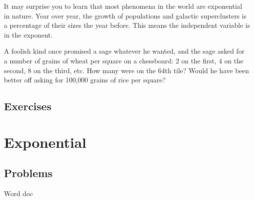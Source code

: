 

It may surprise you to learn that most phenomena in the world are exponential in nature.
Year over year, the growth of populations and galactic superclusters is a percentage of 
their sizes the year before.  This means the independent variable is in the exponent.

A foolish kind once promised a sage whatever he wanted, and the sage asked for
a number of grains of wheat per square on a chessboard: 2 on the first, 4 on the second, 
8 on the third, etc.  How many were on the 64th tile?  Would he have been better off
asking for 100,000 grains of rice per square?

\newpage
\chapterminitoc

\newpage
{}
\newpage

\newpage
\subsection{Exercises}


\newpage
\section{Exponential}
\subsection{Problems}
Word doc
\newpage

\newpage

